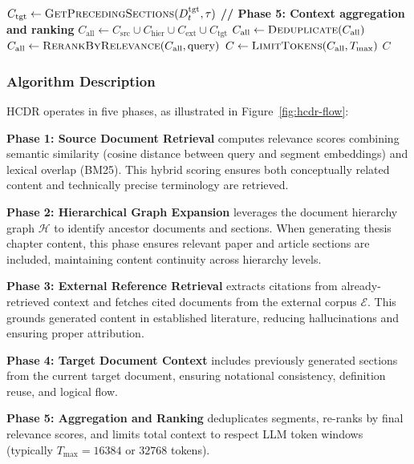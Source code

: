 \documentclass{ieeeaccess}
\begin{document}
\begin{algorithm}[!t]
\begin{algorithmic}[1]
\State \(C_{\text{tgt}} \gets \textsc{GetPrecedingSections}(D^{\text{tgt}}_t, \tau)\) 
\State
\State \textbf{// Phase 5: Context aggregation and ranking}
\State \(C_{\text{all}} \gets C_{\text{src}} \cup C_{\text{hier}} \cup C_{\text{ext}} \cup C_{\text{tgt}}\)
\State \(C_{\text{all}} \gets \textsc{Deduplicate}(C_{\text{all}})\) 
\State \(C_{\text{all}} \gets \textsc{RerankByRelevance}(C_{\text{all}}, \text{query})\) 
\State \(C \gets \textsc{LimitTokens}(C_{\text{all}}, T_{\max})\) 
\State
\State \Return \(C\) 
\end{algorithmic}
\normalsize
\end{algorithm}

\subsubsection{Algorithm Description}

HCDR operates in five phases, as illustrated in Figure~\ref{fig:hcdr-flow}:

\textbf{Phase 1: Source Document Retrieval} computes relevance scores combining semantic similarity (cosine distance between query and segment embeddings) and lexical overlap (BM25). This hybrid scoring ensures both conceptually related content and technically precise terminology are retrieved.

\textbf{Phase 2: Hierarchical Graph Expansion} leverages the document hierarchy graph \(\mathcal{H}\) to identify ancestor documents and sections. When generating thesis chapter content, this phase ensures relevant paper and article sections are included, maintaining content continuity across hierarchy levels.

\textbf{Phase 3: External Reference Retrieval} extracts citations from already-retrieved context and fetches cited documents from the external corpus \(\mathcal{E}\). This grounds generated content in established literature, reducing hallucinations and ensuring proper attribution.

\textbf{Phase 4: Target Document Context} includes previously generated sections from the current target document, ensuring notational consistency, definition reuse, and logical flow.

\textbf{Phase 5: Aggregation and Ranking} deduplicates segments, re-ranks by final relevance scores, and limits total context to respect LLM token windows (typically \(T_{\max} = 16384\) or \(32768\) tokens).
\end{document}
